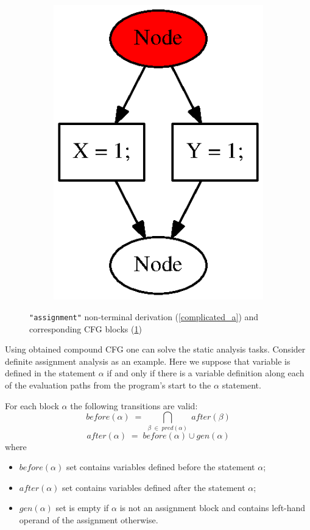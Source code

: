 \documentclass{sig-alternate-05-2015}
\begin{document}
\begin{figure}[h!]
\begin{center}
\begin{subfigure}{0.1\textwidth}
            \includegraphics[scale=0.5]{Graphs/assignment_complicated.eps}
        \caption{}
        \label{complicated_b}
    \end{subfigure}
    \caption{\texttt{"assignment"} non-terminal derivation (\ref{complicated_a}) and corresponding CFG blocks (\ref{complicated_b})}
    \label{complicated_example_pic}
    \end{center}
\end{figure}
Using obtained compound CFG one can solve the static analysis tasks. Consider definite assignment analysis as an example. Here we suppose that variable is defined in the statement $\alpha$ if and only if there is a variable definition along each of the evaluation paths from the program's start to the $\alpha$ statement. 

For each block $\alpha$ the following transitions are valid:
$$
before (\alpha) \;=\; \bigcap_{\beta \;\in\; pred(\alpha)} \;after(\beta)
$$
$$
after (\alpha) \;=\; before(\alpha) \cup gen(\alpha)
$$
where
\begin{itemize}
\item $before(\alpha)$ set contains variables defined before the statement $\alpha$;
\item $after(\alpha)$ set contains variables defined after the statement $\alpha$;
\item $gen(\alpha)$ set is empty if $\alpha$ is not an assignment block and contains left-hand operand of the assignment otherwise. 
\end{itemize}
\end{document}
